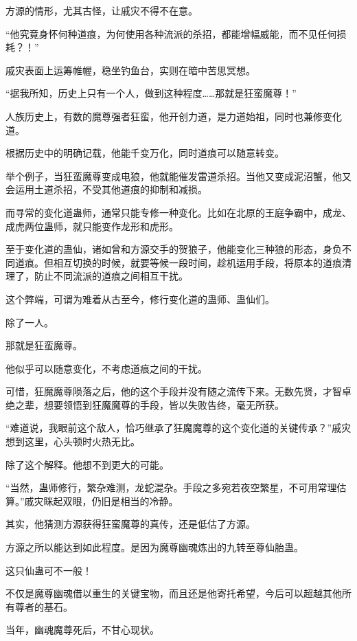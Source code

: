 
\begin{this_body}

方源的情形，尤其古怪，让戚灾不得不在意。

“他究竟身怀何种道痕，为何使用各种流派的杀招，都能增幅威能，而不见任何损耗？！”

戚灾表面上运筹帷幄，稳坐钓鱼台，实则在暗中苦思冥想。

“据我所知，历史上只有一个人，做到这种程度……那就是狂蛮魔尊！”

人族历史上，有数的魔尊强者狂蛮，他开创力道，是力道始祖，同时也兼修变化道。

根据历史中的明确记载，他能千变万化，同时道痕可以随意转变。

举个例子，当狂蛮魔尊变成电狼，他就能催发雷道杀招。当他又变成泥沼蟹，他又会运用土道杀招，不受其他道痕的抑制和减损。

而寻常的变化道蛊师，通常只能专修一种变化。比如在北原的王庭争霸中，成龙、成虎两位蛊师，就只能变作龙形和虎形。

至于变化道的蛊仙，诸如曾和方源交手的贺狼子，他能变化三种狼的形态，身负不同道痕。但相互切换的时候，就要等候一段时间，趁机运用手段，将原本的道痕清理了，防止不同流派的道痕之间相互干扰。

这个弊端，可谓为难着从古至今，修行变化道的蛊师、蛊仙们。

除了一人。

那就是狂蛮魔尊。

他似乎可以随意变化，不考虑道痕之间的干扰。

可惜，狂魔魔尊陨落之后，他的这个手段并没有随之流传下来。无数先贤，才智卓绝之辈，想要领悟到狂魔魔尊的手段，皆以失败告终，毫无所获。

“难道说，我眼前这个敌人，恰巧继承了狂魔魔尊的这个变化道的关键传承？”戚灾想到这里，心头顿时火热无比。

除了这个解释。他想不到更大的可能。

“当然，蛊师修行，繁杂难测，龙蛇混杂。手段之多宛若夜空繁星，不可用常理估算。”戚灾眯起双眼，仍旧是相当的冷静。

其实，他猜测方源获得狂蛮魔尊的真传，还是低估了方源。

方源之所以能达到如此程度。是因为魔尊幽魂炼出的九转至尊仙胎蛊。

这只仙蛊可不一般！

不仅是魔尊幽魂借以重生的关键宝物，而且还是他寄托希望，今后可以超越其他所有尊者的基石。

当年，幽魂魔尊死后，不甘心现状。


\end{this_body}

